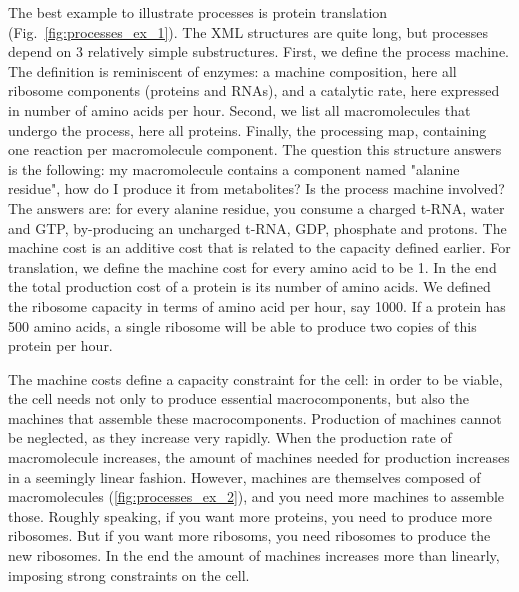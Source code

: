 The best example to illustrate processes is protein translation
(Fig.~\ref{fig:processes_ex_1}).
The XML structures are quite long, but processes depend on 3 relatively
simple substructures.
First, we define the process machine.
The definition is reminiscent of enzymes:
a machine composition, here all ribosome components (proteins and RNAs),
and a catalytic rate, here expressed in number of amino acids per hour.
Second, we list all macromolecules that undergo the process, here all proteins.
Finally, the processing map, containing one reaction per macromolecule component.
The question this structure answers is the following:
my macromolecule contains a component named "alanine residue",
how do I produce it from metabolites? Is the process machine involved?
The answers are: for every alanine residue, you consume a charged t-RNA,
water and GTP, by-producing an uncharged t-RNA, GDP, phosphate and protons.
The machine cost is an additive cost that is related to the capacity defined earlier.
For translation, we define the machine cost for every amino acid to be 1.
In the end the total production cost of a protein is its number of amino acids.
We defined the ribosome capacity in terms of amino acid per hour, say 1000.
If a protein has 500 amino acids, a single ribosome will be able to produce
two copies of this protein per hour.

The machine costs define a capacity constraint for the cell:
in order to be viable, the cell needs not only to produce essential macrocomponents,
but also the machines that assemble these macrocomponents.
Production of machines cannot be neglected, as they increase very rapidly.
When the production rate of macromolecule increases,
the amount of machines needed for production increases in a seemingly linear fashion.
However, machines are themselves composed of macromolecules (\ref{fig:processes_ex_2}),
and you need more machines to assemble those.
Roughly speaking, if you want more proteins, you need to produce more ribosomes.
But if you want more ribosoms, you need ribosomes to produce the new ribosomes.
In the end the amount of machines increases more than linearly,
imposing strong constraints on the cell.


